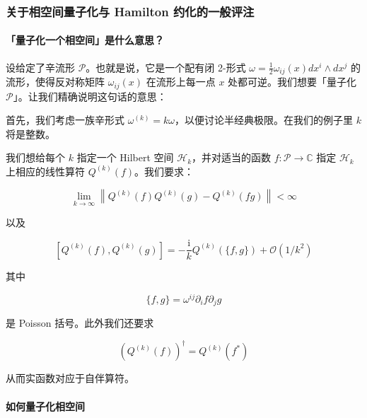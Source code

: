 \subsubsection{关于相空间量子化与 Hamilton 约化的一般评注} %

\paragraph{「量子化一个相空间」是什么意思？} %

设给定了辛流形 $\mathcal{P}$。也就是说，它是一个配有闭 2-形式 $\omega=\frac12\omega_{ij}(x)dx^{i}\wedge dx^{j}$ 的流形，使得反对称矩阵 $\omega_{ij}(x)$ 在流形上每一点 $x$ 处都可逆。我们想要「量子化 $\mathcal{P}$」。让我们精确说明这句话的意思：

首先，我们考虑一族辛形式 $\omega^{(k)}=k\omega$，以便讨论半经典极限。在我们的例子里 $k$ 将是整数。

我们想给每个 $k$ 指定一个 Hilbert 空间 $\mathcal{H}_k$，并对适当的函数 $f:\mathcal{P}\to\mathbb{C}$ 指定 $\mathcal{H}_k$ 上相应的线性算符 $Q^{(k)}(f)$。我们要求：

\begin{equation}
  \lim_{k\to\infty}\left\|Q^{(k)}(f)Q^{(k)}(g)-Q^{(k)}(fg)\right\|<\infty
  \tag{2.75}
  \label{eq:2.75}
\end{equation}

以及

\begin{equation}
  \left[Q^{(k)}(f),Q^{(k)}(g)\right]=-\frac{\mathrm{i}}{k}Q^{(k)}(\{f,g\})+\mathcal{O}(1/k^{2})
  \tag{2.76}
  \label{eq:2.76}
\end{equation}

其中

\begin{equation}
  \{f,g\}=\omega^{ij}\partial_if\partial_jg
  \tag{2.77}
  \label{eq:2.77}
\end{equation}

是 Poisson 括号。此外我们还要求

\begin{equation}
  \left(Q^{(k)}(f)\right)^{\dagger}=Q^{(k)}(f^{*})
  \tag{2.78}
  \label{eq:2.78}
\end{equation}

从而实函数对应于自伴算符。

\paragraph{如何量子化相空间} %

